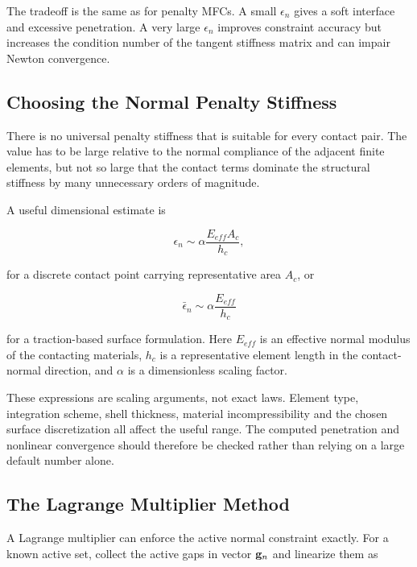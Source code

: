 The tradeoff is the same as for penalty MFCs. A small $ \epsilon_n $ gives a
soft interface and excessive penetration. A very large $ \epsilon_n $ improves
constraint accuracy but increases the condition number of the tangent stiffness
matrix and can impair Newton convergence.

\subsection{Choosing the Normal Penalty Stiffness}

There is no universal penalty stiffness that is suitable for every contact pair.
The value has to be large relative to the normal compliance of the adjacent
finite elements, but not so large that the contact terms dominate the structural
stiffness by many unnecessary orders of magnitude.

A useful dimensional estimate is

\begin{equation}\label{contact-penalty-scaling}
    \epsilon_n \sim \alpha \frac{E_{eff} A_c}{h_c},
\end{equation}

for a discrete contact point carrying representative area $ A_c $, or

\begin{equation}
    \bar{\epsilon}_n \sim \alpha \frac{E_{eff}}{h_c}
\end{equation}

for a traction-based surface formulation. Here $ E_{eff} $ is an effective
normal modulus of the contacting materials, $ h_c $ is a representative element
length in the contact-normal direction, and $ \alpha $ is a dimensionless
scaling factor.

These expressions are scaling arguments, not exact laws. Element type,
integration scheme, shell thickness, material incompressibility and the chosen
surface discretization all affect the useful range. The computed penetration
and nonlinear convergence should therefore be checked rather than relying on a
large default number alone.

\subsection{The Lagrange Multiplier Method}

A Lagrange multiplier can enforce the active normal constraint exactly. For a
known active set, collect the active gaps in vector $ \mathbf{g}_n $ and linearize
them as

